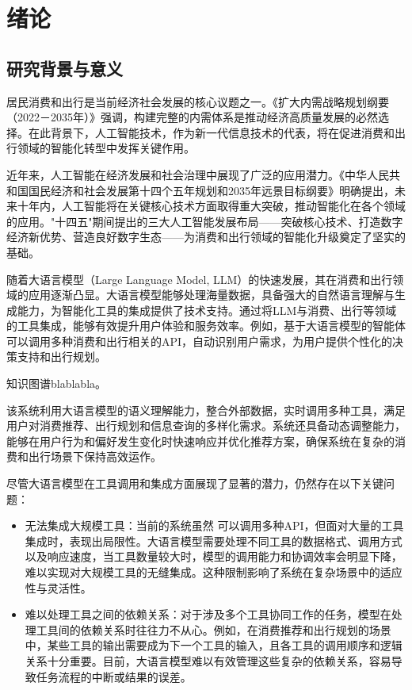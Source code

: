 
\chapter{绪论}

\section{研究背景与意义}

居民消费和出行是当前经济社会发展的核心议题之一。《扩大内需战略规划纲要（2022－2035年）》强调，构建完整的内需体系是推动经济高质量发展的必然选择。在此背景下，人工智能技术，作为新一代信息技术的代表，将在促进消费和出行领域的智能化转型中发挥关键作用。

近年来，人工智能在经济发展和社会治理中展现了广泛的应用潜力。《中华人民共和国国民经济和社会发展第十四个五年规划和2035年远景目标纲要》明确提出，未来十年内，人工智能将在关键核心技术方面取得重大突破，推动智能化在各个领域的应用。"十四五"期间提出的三大人工智能发展布局——突破核心技术、打造数字经济新优势、营造良好数字生态——为消费和出行领域的智能化升级奠定了坚实的基础。

随着大语言模型（Large Language Model, LLM）的快速发展，其在消费和出行领域的应用逐渐凸显。大语言模型能够处理海量数据，具备强大的自然语言理解与生成能力，为智能化工具的集成提供了技术支持。通过将LLM与消费、出行等领域的工具集成，能够有效提升用户体验和服务效率。例如，基于大语言模型的智能体可以调用多种消费和出行相关的API，自动识别用户需求，为用户提供个性化的决策支持和出行规划。

知识图谱blablabla。

该系统利用大语言模型的语义理解能力，整合外部数据，实时调用多种工具，满足用户对消费推荐、出行规划和信息查询的多样化需求。系统还具备动态调整能力，能够在用户行为和偏好发生变化时快速响应并优化推荐方案，确保系统在复杂的消费和出行场景下保持高效运作。

尽管大语言模型在工具调用和集成方面展现了显著的潜力，仍然存在以下关键问题：

\begin{itemize}
    \item 无法集成大规模工具：当前的系统虽然 可以调用多种API，但面对大量的工具集成时，表现出局限性。大语言模型需要处理不同工具的数据格式、调用方式以及响应速度，当工具数量较大时，模型的调用能力和协调效率会明显下降，难以实现对大规模工具的无缝集成。这种限制影响了系统在复杂场景中的适应性与灵活性。
    \item 难以处理工具之间的依赖关系：对于涉及多个工具协同工作的任务，模型在处理工具间的依赖关系时往往力不从心。例如，在消费推荐和出行规划的场景中，某些工具的输出需要成为下一个工具的输入，且各工具的调用顺序和逻辑关系十分重要。目前，大语言模型难以有效管理这些复杂的依赖关系，容易导致任务流程的中断或结果的误差。
\end{itemize}

